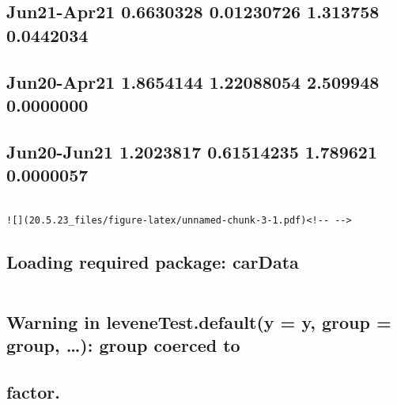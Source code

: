 \documentclass[
]{article}
\begin{document}
\hypertarget{jun21-apr21-0.6630328-0.01230726-1.313758-0.0442034}{%
\subsection{Jun21-Apr21 0.6630328 0.01230726 1.313758
0.0442034}\label{jun21-apr21-0.6630328-0.01230726-1.313758-0.0442034}}

\hypertarget{jun20-apr21-1.8654144-1.22088054-2.509948-0.0000000}{%
\subsection{Jun20-Apr21 1.8654144 1.22088054 2.509948
0.0000000}\label{jun20-apr21-1.8654144-1.22088054-2.509948-0.0000000}}

\hypertarget{jun20-jun21-1.2023817-0.61514235-1.789621-0.0000057}{%
\subsection{Jun20-Jun21 1.2023817 0.61514235 1.789621
0.0000057}\label{jun20-jun21-1.2023817-0.61514235-1.789621-0.0000057}}

\begin{verbatim}

![](20.5.23_files/figure-latex/unnamed-chunk-3-1.pdf)<!-- --> 
\end{verbatim}

\hypertarget{loading-required-package-cardata}{%
\subsection{Loading required package:
carData}\label{loading-required-package-cardata}}

\begin{verbatim}
\end{verbatim}

\hypertarget{warning-in-levenetest.defaulty-y-group-group-group-coerced-to}{%
\subsection{Warning in leveneTest.default(y = y, group = group, \ldots):
group coerced
to}\label{warning-in-levenetest.defaulty-y-group-group-group-coerced-to}}

\hypertarget{factor.}{%
\subsection{factor.}\label{factor.}}
\end{document}
